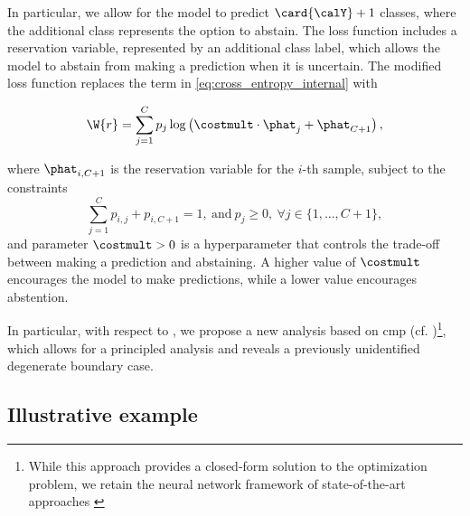 In particular, we allow for the model to predict \(\card{\calY} + 1\) classes, where the additional class represents the option to abstain. The loss function includes a reservation variable, represented by an additional class label, which allows the model to abstain from making a prediction when it is uncertain. The modified loss function replaces the term in \cref{eq:cross_entropy_internal} with

\begin{align}
    \label{eq:reject_cross_entropy_internal}
    \W{r}=\sum_{j=1}^{C} p_{j}\log\left(\costmult\cdot\phat_{j}+\phat_{C+1}\right),
\end{align}

where \(\phat_{i,C+1}\) is the reservation variable for the \(i\)-th sample, subject to the constraints
\[
    \sum_{j=1}^{C} p_{i,j}+p_{i,C+1}=1,\ \text{and}\
    p_j\ge 0,\ \forall j\in\{1,\ldots,C+1\},
\]
and parameter \(\costmult>0\) is a hyperparameter that controls the trade-off between making a prediction and abstaining. A higher value of \(\costmult\) encourages the model to make predictions, while a lower value encourages abstention.

In particular, with respect to \cite{liu2019deep}, we propose a new analysis based on \gls*{cmp} (cf. \cite{boyd2004convex})\footnote{While this approach provides a closed-form solution to the optimization problem, we retain the neural network framework of state-of-the-art approaches \cite{shenoy2026uncertainty}}, which allows for a principled analysis and reveals a previously unidentified degenerate boundary case.

\subsection{Illustrative example}
\label{subsec:illustrative_example}


